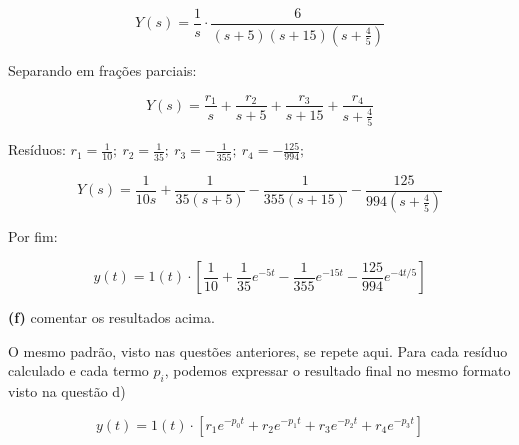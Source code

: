 \documentclass{article}
\begin{document}
\[ Y(s) = \frac{1}{s} \cdot \frac{6}{(s+5)(s+15)(s+ \frac{4}{5})} \]

Separando em frações parciais:

\[ Y(s) = \frac{r_1}{s} + \frac{r_2}{s+5} + \frac{r_3}{s+15} + \frac{r_4}{s+ \frac{4}{5}} \]

\vspace{\baselineskip}

Resíduos: $ r_1 = \frac{1}{10}; \ r_2 = \frac{1}{35}; \ r_3 = - \frac{1}{355}; \ r_4 = - \frac{125}{994}; $

\[ Y(s) = \frac{1}{10s} + \frac{1}{35(s+5)} - \frac{1}{355(s+15)} - \frac{125}{994(s+ \frac{4}{5})} \]

Por fim:

\[ y(t) = 1(t) \cdot \left[ \frac{1}{10} + \frac{1}{35}e^{-5t} - \frac{1}{355}e^{-15t} - \frac{125}{994}e^{-4t/5} \right] \]

\vspace{\baselineskip}

\textbf{(f)} comentar os resultados acima.

\vspace{\baselineskip}

O mesmo padrão, visto nas questões anteriores, se repete aqui. 
Para cada resíduo calculado e cada termo $ p_i $, podemos expressar o resultado final 
no mesmo formato visto na questão d)

\[ y(t) = 1(t) \cdot \left[ r_1 e^{-p_0 t} + r_2 e^{-p_1 t} + r_3 e^{-p_2 t} + r_4 e^{-p_3 t} \right]\]
\end{document}
